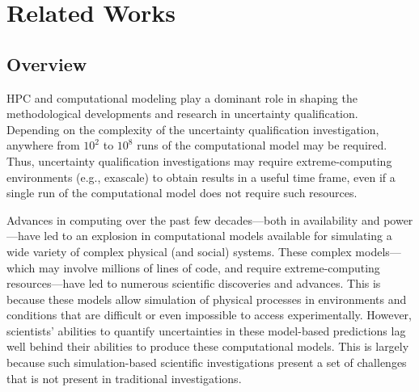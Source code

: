 

\chapter{Related Works}\label{cap_backgroud}

\section{Overview}

HPC and computational modeling play a dominant role in shaping the methodological developments and research in uncertainty qualification. Depending on the complexity of the uncertainty qualification investigation, anywhere from $10^{2}$ to $10^{8}$ runs of the computational model may be required. Thus, uncertainty qualification investigations may require extreme-computing environments (e.g., exascale) to obtain results in a useful time frame, even if a single run of the computational model does not require such resources. 

Advances in computing over the past few decades—both in availability and power—have led to an explosion in computational models available for simulating a wide variety of complex physical (and social) systems. These complex models—which may involve millions of lines of code, and require extreme-computing resources—have led to numerous scientific discoveries and advances. This is because these models allow simulation of physical processes in environments and conditions that are difficult or even impossible to access experimentally. However, scientists’ abilities to quantify uncertainties in these model-based predictions lag well behind their abilities to produce these computational models. This is largely because such simulation-based scientific investigations present a set of challenges that is not present in traditional investigations.

